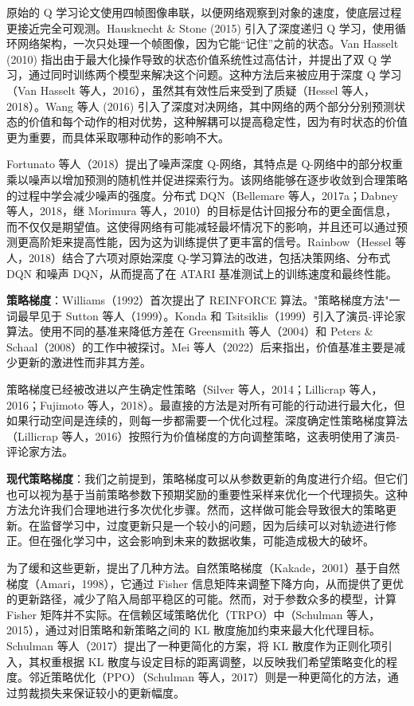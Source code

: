原始的 Q 学习论文使用四帧图像串联，以便网络观察到对象的速度，使底层过程更接近完全可观测。Hausknecht & Stone (2015) 引入了深度递归 Q 学习，使用循环网络架构，一次只处理一个帧图像，因为它能“记住”之前的状态。Van Hasselt (2010) 指出由于最大化操作导致的状态价值系统性过高估计，并提出了双 Q 学习，通过同时训练两个模型来解决这个问题。这种方法后来被应用于深度 Q 学习（Van Hasselt 等人，2016），虽然其有效性后来受到了质疑（Hessel 等人，2018）。Wang 等人 (2016) 引入了深度对决网络，其中网络的两个部分分别预测状态的价值和每个动作的相对优势，这种解耦可以提高稳定性，因为有时状态的价值更为重要，而具体采取哪种动作的影响不大。

Fortunato 等人（2018）提出了噪声深度 Q-网络，其特点是 Q-网络中的部分权重乘以噪声以增加预测的随机性并促进探索行为。该网络能够在逐步收敛到合理策略的过程中学会减少噪声的强度。分布式 DQN（Bellemare 等人，2017a；Dabney 等人，2018，继 Morimura 等人，2010）的目标是估计回报分布的更全面信息，而不仅仅是期望值。这使得网络有可能减轻最坏情况下的影响，并且还可以通过预测更高阶矩来提高性能，因为这为训练提供了更丰富的信号。Rainbow（Hessel 等人，2018）结合了六项对原始深度 Q-学习算法的改进，包括决策网络、分布式 DQN 和噪声 DQN，从而提高了在 ATARI 基准测试上的训练速度和最终性能。

\textbf{策略梯度}：Williams（1992）首次提出了 REINFORCE 算法。"策略梯度方法"一词最早见于 Sutton 等人（1999）。Konda 和 Tsitsiklis（1999）引入了演员-评论家算法。使用不同的基准来降低方差在 Greensmith 等人（2004）和 Peters & Schaal（2008）的工作中被探讨。Mei 等人（2022）后来指出，价值基准主要是减少更新的激进性而非其方差。

策略梯度已经被改进以产生确定性策略（Silver 等人，2014；Lillicrap 等人，2016；Fujimoto 等人，2018）。最直接的方法是对所有可能的行动进行最大化，但如果行动空间是连续的，则每一步都需要一个优化过程。深度确定性策略梯度算法（Lillicrap 等人，2016）按照行为价值梯度的方向调整策略，这表明使用了演员-评论家方法。

\textbf{现代策略梯度}：我们之前提到，策略梯度可以从参数更新的角度进行介绍。但它们也可以视为基于当前策略参数下预期奖励的重要性采样来优化一个代理损失。这种方法允许我们合理地进行多次优化步骤。然而，这样做可能会导致很大的策略更新。在监督学习中，过度更新只是一个较小的问题，因为后续可以对轨迹进行修正。但在强化学习中，这会影响到未来的数据收集，可能造成极大的破坏。

为了缓和这些更新，提出了几种方法。自然策略梯度（Kakade，2001）基于自然梯度（Amari，1998），它通过 Fisher 信息矩阵来调整下降方向，从而提供了更优的更新路径，减少了陷入局部平稳区的可能。然而，对于参数众多的模型，计算 Fisher 矩阵并不实际。在信赖区域策略优化（TRPO）中（Schulman 等人，2015），通过对旧策略和新策略之间的 KL 散度施加约束来最大化代理目标。Schulman 等人（2017）提出了一种更简化的方案，将 KL 散度作为正则化项引入，其权重根据 KL 散度与设定目标的距离调整，以反映我们希望策略变化的程度。邻近策略优化（PPO）（Schulman 等人，2017）则是一种更简化的方法，通过剪裁损失来保证较小的更新幅度。

